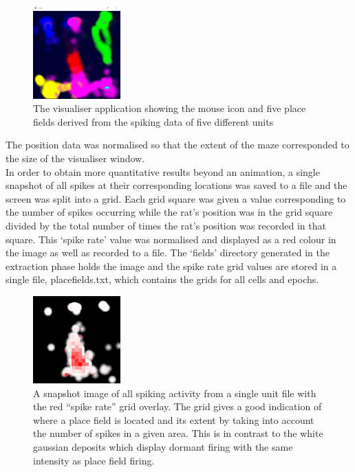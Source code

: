 \documentclass[11pt]{report}
\begin{document}
\begin{figure}[h!]
\centering
  \includegraphics[width=0.3\textwidth]{placefields}
\caption{The visualiser application showing the mouse icon and five place fields derived from the spiking data of five different units}
\label{fig:b}
\end{figure}

The position data was normalised so that the extent of the maze corresponded to the size of the visualiser window. \\
In order to obtain more quantitative results beyond an animation, a single snapshot of all spikes at their corresponding locations was saved to a file and the screen was split into a grid. Each grid square was given a value corresponding to the number of spikes occurring while the rat's position was in the grid square divided by the total number of times the rat's position was recorded in that square. This `spike rate' value was normalised and displayed as a red colour in the image as well as recorded to a file. The `fields' directory generated in the extraction phase holds the image and the spike rate grid values are stored in a single file, placefields.txt, which contains the grids for all cells and epochs.

\begin{figure}[h!]
\centering
  \includegraphics[width=0.3\textwidth]{grid}
\caption{A snapshot image of all spiking activity from a single unit file with the red “spike rate” grid overlay. The grid gives a good indication of where a place field is located and its extent by taking into account the number of spikes in a given area. This is in contrast to the white gaussian deposits which display dormant firing with the same intensity as place field firing.}
\label{fig:c}
\end{figure}
\end{document}

